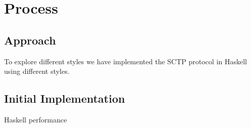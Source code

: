 \chapter{Process}
\section{Approach}
To explore different styles we have implemented the SCTP protocol\cite{_rfc_????} in Haskell using different styles.
\section{Initial Implementation}
Haskell performance \cite{epstein_haskell_????}

